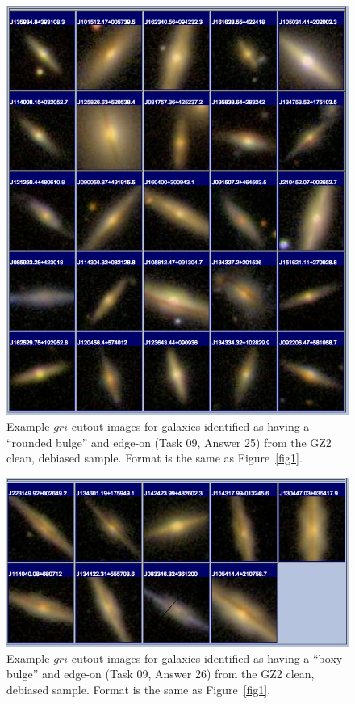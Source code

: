 \documentclass[useAMS,usenatbib]{mn2e}
\begin{document}
\newpage
\clearpage
\begin{figure}
\includegraphics[angle=0,width=7.0in]{figures/gallery/roundedbulge.png}
\caption{Example $gri$ cutout images for galaxies identified as having a ``rounded bulge'' and edge-on (Task 09, Answer 25) from the GZ2 clean, debiased sample. Format is the same as Figure~\ref{fig1}.}
\end{figure}

\newpage
\clearpage
\begin{figure}
\includegraphics[angle=0,width=7.0in]{figures/gallery/boxybulge.png}
\caption{Example $gri$ cutout images for galaxies identified as having a ``boxy bulge'' and edge-on (Task 09, Answer 26) from the GZ2 clean, debiased sample. Format is the same as Figure~\ref{fig1}.}
\end{figure}
\end{document}

